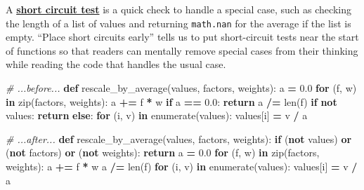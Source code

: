 \documentclass[
]{krantz}
\makeatletter
\newenvironment{Shaded}{\begin{snugshade}}{\end{snugshade}}
\newcommand{\BuiltInTok}[1]{#1}
\newcommand{\CommentTok}[1]{\textcolor[rgb]{0.56,0.35,0.01}{\textit{#1}}}
\newcommand{\ControlFlowTok}[1]{\textcolor[rgb]{0.13,0.29,0.53}{\textbf{#1}}}
\newcommand{\FloatTok}[1]{\textcolor[rgb]{0.00,0.00,0.81}{#1}}
\newcommand{\KeywordTok}[1]{\textcolor[rgb]{0.13,0.29,0.53}{\textbf{#1}}}
\newcommand{\NormalTok}[1]{#1}
\newcommand{\OperatorTok}[1]{\textcolor[rgb]{0.81,0.36,0.00}{\textbf{#1}}}
\newenvironment{kframe}{%
\medskip{}
\setlength{\fboxsep}{.8em}
 \def\at@end@of@kframe{}%
 \ifinner\ifhmode%
  \def\at@end@of@kframe{\end{minipage}}%
  \begin{minipage}{\columnwidth}%
 \fi\fi%
 \def\FrameCommand##1{\hskip\@totalleftmargin \hskip-\fboxsep
 \colorbox{shadecolor}{##1}\hskip-\fboxsep
     \hskip-\linewidth \hskip-\@totalleftmargin \hskip\columnwidth}%
 \MakeFramed {\advance\hsize-\width
   \@totalleftmargin\z@ \linewidth\hsize
   \@setminipage}}%
 {\par\unskip\endMakeFramed%
 \at@end@of@kframe}
\renewenvironment{Shaded}{\begin{kframe}}{\end{kframe}}
\newcommand{\gref}[2]{\hyperlink{#2}{\textbf{#1}}}
\makeatother
\begin{document}
A \gref{short circuit test}{short\_circuit\_test} is a quick check to handle a special case,
such as checking the length of a list of values
and returning \texttt{math.nan} for the average if the list is empty.
``Place short circuits early'' tells us to put short-circuit tests near the start of functions
so that readers can mentally remove special cases from their thinking
while reading the code that handles the usual case.

\begin{Shaded}
\begin{Highlighting}[]
\CommentTok{\# ...before...}
\KeywordTok{def}\NormalTok{ rescale\_by\_average(values, factors, weights):}
\NormalTok{    a }\OperatorTok{=} \FloatTok{0.0}
    \ControlFlowTok{for}\NormalTok{ (f, w) }\KeywordTok{in} \BuiltInTok{zip}\NormalTok{(factors, weights):}
\NormalTok{        a }\OperatorTok{+=}\NormalTok{ f }\OperatorTok{*}\NormalTok{ w}
    \ControlFlowTok{if}\NormalTok{ a }\OperatorTok{==} \FloatTok{0.0}\NormalTok{:}
        \ControlFlowTok{return}
\NormalTok{    a }\OperatorTok{/=} \BuiltInTok{len}\NormalTok{(f)}
    \ControlFlowTok{if} \KeywordTok{not}\NormalTok{ values:}
        \ControlFlowTok{return}
    \ControlFlowTok{else}\NormalTok{:}
        \ControlFlowTok{for}\NormalTok{ (i, v) }\KeywordTok{in} \BuiltInTok{enumerate}\NormalTok{(values):}
\NormalTok{            values[i] }\OperatorTok{=}\NormalTok{ v }\OperatorTok{/}\NormalTok{ a}
\end{Highlighting}
\end{Shaded}

\begin{Shaded}
\begin{Highlighting}[]
\CommentTok{\# ...after...}
\KeywordTok{def}\NormalTok{ rescale\_by\_average(values, factors, weights):}
    \ControlFlowTok{if}\NormalTok{ (}\KeywordTok{not}\NormalTok{ values) }\KeywordTok{or}\NormalTok{ (}\KeywordTok{not}\NormalTok{ factors) }\KeywordTok{or}\NormalTok{ (}\KeywordTok{not}\NormalTok{ weights):}
        \ControlFlowTok{return}
\NormalTok{    a }\OperatorTok{=} \FloatTok{0.0}
    \ControlFlowTok{for}\NormalTok{ (f, w) }\KeywordTok{in} \BuiltInTok{zip}\NormalTok{(factors, weights):}
\NormalTok{        a }\OperatorTok{+=}\NormalTok{ f }\OperatorTok{*}\NormalTok{ w}
\NormalTok{    a }\OperatorTok{/=} \BuiltInTok{len}\NormalTok{(f)}
    \ControlFlowTok{for}\NormalTok{ (i, v) }\KeywordTok{in} \BuiltInTok{enumerate}\NormalTok{(values):}
\NormalTok{        values[i] }\OperatorTok{=}\NormalTok{ v }\OperatorTok{/}\NormalTok{ a}
\end{Highlighting}
\end{Shaded}
\end{document}
